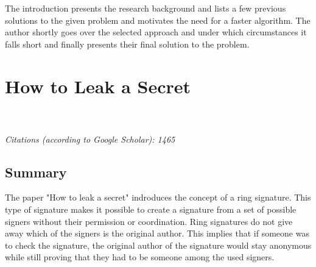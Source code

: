\documentclass{scrartcl}
\begin{document}
The introduction presents the research background and lists a few previous solutions to the given problem and motivates the need for a faster algorithm. The author shortly goes over the selected approach and under which circumstances it falls short and finally presents their final solution to the problem. 

\section{How to Leak a Secret}
\\\\
\emph{Citations (according to Google Scholar): 1465}
\subsection{Summary}
The paper "How to leak a secret" \cite{rivest2001leak} indroduces the concept of a ring signature. This type of signature makes it possible to create a signature from a set of possible signers without their permission or coordination. Ring signatures do not give away which of the signers is the original author.  This implies that if someone was to check the signature, the original author of the signature would stay anonymous while still proving that they had to be someone among the used signers. %
\end{document}
